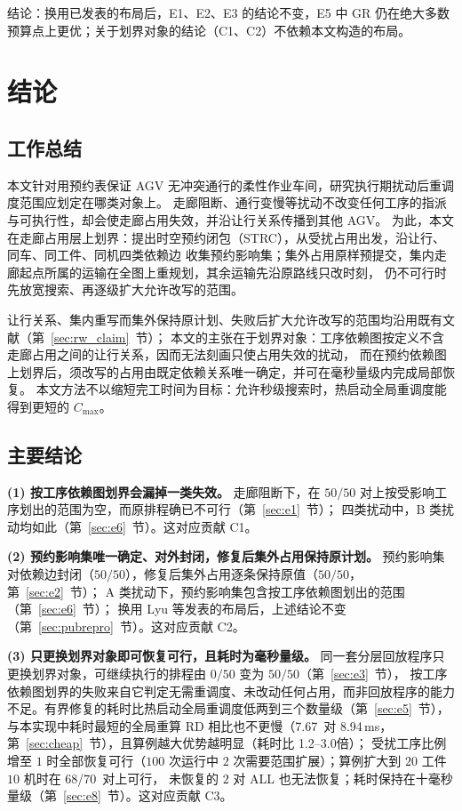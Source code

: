 \documentclass[manuscript,screen,review]{acmart}
\providecommand{\STRC}{\textsc{STRC}}
\newcommand{\NPairs}{50}
\newcommand{\PassMiss}{\NPairs/\NPairs}      %
\newcommand{\FeasRone}{0/\NPairs}            %
\newcommand{\FeasRtwo}{\NPairs/\NPairs}  %
\newcommand{\PassClosed}{\NPairs/\NPairs}    %
\newcommand{\PassInvar}{\NPairs/\NPairs}  %
\newcommand{\MsRedecode}{8.94}       %
\newcommand{\MsCheapRtwo}{7.67}      %
\newcommand{\ScalePairs}{70}
\newcommand{\ScaleJobsHi}{20}
\newcommand{\ScaleMachHi}{10}
\newcommand{\ScaleRatioLo}{1.2}  %
\newcommand{\ScaleRatioHi}{3.0}  %
\newcommand{\ScaleFeasAll}{68/\ScalePairs}     %
\begin{document}
结论：换用已发表的布局后，E1、E2、E3 的结论不变，E5 中 GR 仍在绝大多数预算点上更优；关于划界对象的结论（C1、C2）不依赖本文构造的布局。

\section{结论}
\label{sec:conclusion}

\subsection{工作总结}

本文针对用预约表保证 AGV 无冲突通行的柔性作业车间，研究执行期扰动后重调度范围应划定在哪类对象上。
走廊阻断、通行变慢等扰动不改变任何工序的指派与可执行性，却会使走廊占用失效，并沿让行关系传播到其他 AGV。
为此，本文在走廊占用层上划界：提出时空预约闭包（\STRC{}），从受扰占用出发，沿让行、同车、同工件、同机四类依赖边
收集预约影响集；集外占用原样预提交，集内走廊起点所属的运输在全图上重规划，其余运输先沿原路线只改时刻，
仍不可行时先放宽搜索、再逐级扩大允许改写的范围。

让行关系、集内重写而集外保持原计划、失败后扩大允许改写的范围均沿用既有文献（第~\ref{sec:rw_claim}~节）；
本文的主张在于划界对象：工序依赖图按定义不含走廊占用之间的让行关系，因而无法刻画只使占用失效的扰动，
而在预约依赖图上划界后，须改写的占用由既定依赖关系唯一确定，并可在毫秒量级内完成局部恢复。
本文方法不以缩短完工时间为目标：允许秒级搜索时，热启动全局重调度能得到更短的 \(C_{\max}\)。

\subsection{主要结论}

\textbf{(1) 按工序依赖图划界会漏掉一类失效。}
走廊阻断下，在 \(\PassMiss\) 对上按受影响工序划出的范围为空，而原排程确已不可行（第~\ref{sec:e1}~节）；
四类扰动中，B 类扰动均如此（第~\ref{sec:e6}~节）。这对应贡献 C1。

\textbf{(2) 预约影响集唯一确定、对外封闭，修复后集外占用保持原计划。}
预约影响集对依赖边封闭（\(\PassClosed\)），修复后集外占用逐条保持原值（\(\PassInvar\)，第~\ref{sec:e2}~节）；
A 类扰动下，预约影响集包含按工序依赖图划出的范围（第~\ref{sec:e6}~节）；
换用 Lyu 等发表的布局后，上述结论不变（第~\ref{sec:pubrepro}~节）。这对应贡献 C2。

\textbf{(3) 只更换划界对象即可恢复可行，且耗时为毫秒量级。}
同一套分层回放程序只更换划界对象，可继续执行的排程由 \(\FeasRone\) 变为 \(\FeasRtwo\)（第~\ref{sec:e3}~节），
按工序依赖图划界的失败来自它判定无需重调度、未改动任何占用，而非回放程序的能力不足。有界修复的耗时比热启动全局重调度低两到三个数量级（第~\ref{sec:e5}~节），
与本实现中耗时最短的全局重算 RD 相比也不更慢（\MsCheapRtwo\ 对 \MsRedecode\,ms，第~\ref{sec:cheap}~节），且算例越大优势越明显（耗时比 \ScaleRatioLo--\ScaleRatioHi 倍）；
受扰工序比例增至 \(1\) 时全部恢复可行（\(100\) 次运行中 \(2\) 次需要范围扩展）；算例扩大到 \(\ScaleJobsHi\) 工件 \(\ScaleMachHi\) 机时在 \ScaleFeasAll\ 对上可行，
未恢复的 \(2\) 对 ALL 也无法恢复；耗时保持在十毫秒量级（第~\ref{sec:e8}~节）。这对应贡献 C3。
\end{document}
